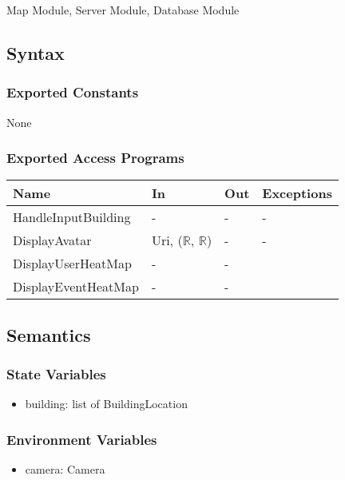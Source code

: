 \documentclass[12pt, titlepage]{article}
\begin{document}
Map Module, Server Module, Database Module

\subsection{Syntax}

\subsubsection{Exported Constants}

None

\subsubsection{Exported Access Programs}

\begin{center}
\begin{tabular}{p{4cm} p{3cm} p{3cm} p{4cm}}
\hline
\textbf{Name} & \textbf{In} & \textbf{Out} & \textbf{Exceptions} \\
\hline
HandleInputBuilding & - & - & - \\
DisplayAvatar & Uri, ($\mathbb{R}$, $\mathbb{R}$) & - & -\\
DisplayUserHeatMap & - & -\\
DisplayEventHeatMap & - & -\\

\hline
\end{tabular}
\end{center}

\subsection{Semantics}

\subsubsection{State Variables}

\begin{itemize}
\item building: list of BuildingLocation
\end{itemize}

\subsubsection{Environment Variables}
\begin{itemize}
\item camera: Camera
\end{itemize}
  
\end{document}

